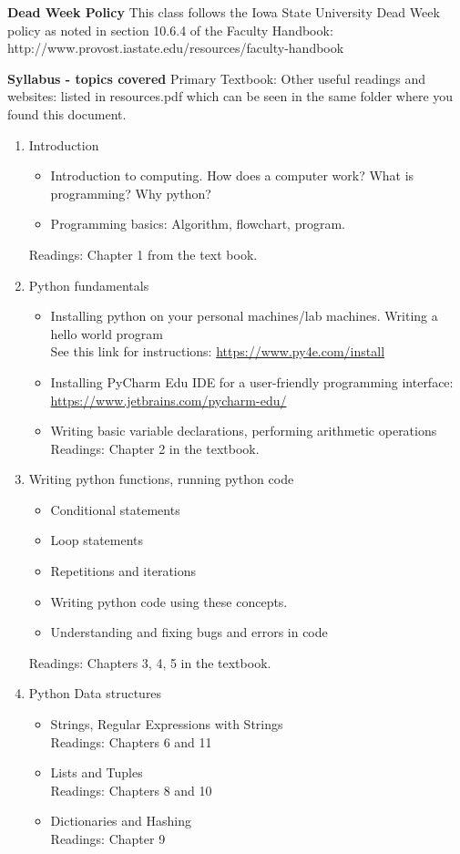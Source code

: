 \documentclass[11pt,a4paper]{article}
\begin{document}
\bigskip\textbf{\large Dead Week Policy}
This class follows the Iowa State University Dead Week policy as noted in section 10.6.4 of the Faculty Handbook: http://www.provost.iastate.edu/resources/faculty-handbook

\bigskip\textbf{\large Syllabus - topics covered}
Primary Textbook: 
Other useful readings and websites: listed in resources.pdf which can be seen in the same folder where you found this document. 

\begin{enumerate}
\item Introduction
\begin{itemize}
\item Introduction to computing. How does a computer work? What is programming? Why python?
\item Programming basics: Algorithm, flowchart, program.
\end{itemize}
Readings: Chapter 1 from the text book. 

\item Python fundamentals
\begin{itemize}
\item Installing python on your personal machines/lab machines. Writing a hello world program
\\ See this link for instructions: \url{https://www.py4e.com/install}
\item Installing PyCharm Edu IDE for a user-friendly programming interface: \url{https://www.jetbrains.com/pycharm-edu/}
\item Writing basic variable declarations, performing arithmetic operations
\\Readings: Chapter 2 in the textbook.
\end{itemize}

\item Writing python functions, running python code
\begin{itemize}
\item Conditional statements
\item Loop statements
\item Repetitions and iterations
\item Writing python code using these concepts.
\item Understanding and fixing bugs and errors in code
\end{itemize}
Readings: Chapters 3, 4, 5 in the textbook.

\item Python Data structures 
\begin{itemize}
\item Strings, Regular Expressions with Strings
\\  Readings: Chapters 6 and 11
\item Lists and Tuples
\\  Readings: Chapters 8 and 10
\item Dictionaries and Hashing
\\  Readings: Chapter 9
\end{itemize}


\end{enumerate}
\end{document}
